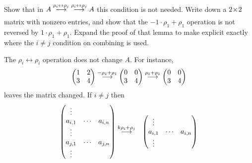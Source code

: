 \begin{exercises}
\begin{exparts}
        Show that in 
        $A\mathrel{ \mathop{\longrightarrow}\limits^{\rho_i\leftrightarrow\rho_j\mathstrut}_{ \begin{subarray}{l} \relax \end{subarray}}}\;
          \mathrel{ \mathop{\longrightarrow}\limits^{\rho_i\leftrightarrow\rho_j\mathstrut}_{ \begin{subarray}{l} \relax \end{subarray}}}A$
        this condition is not needed.
     \partsitem Write down a $2 \! \times \! 2$ matrix with nonzero entries,
        and show that the $-1\cdot\rho_1+\rho_1$ operation is not
        reversed by $1\cdot\rho_1+\rho_1$.
     \partsitem Expand the proof of that lemma to make explicit exactly where 
        the $i\neq j$ condition on combining is used.
   \end{exparts}
   \begin{answer}
    \begin{exparts}
      \partsitem The $\rho_i\leftrightarrow\rho_i$ operation does not
        change $A$.
      \partsitem For instance,
        \begin{equation*}
          \begin{pmatrix}
            1  &2  \\
            3  &4  
          \end{pmatrix}
          \mathrel{ \mathop{\longrightarrow}\limits^{-\rho_1+\rho_1\mathstrut}_{ \begin{subarray}{l} \relax \end{subarray}}}
          \begin{pmatrix}
            0  &0  \\
            3  &4  
          \end{pmatrix}
          \mathrel{ \mathop{\longrightarrow}\limits^{\rho_1+\rho_1\mathstrut}_{ \begin{subarray}{l} \relax \end{subarray}}}
          \begin{pmatrix}
            0  &0  \\
            3  &4  
          \end{pmatrix}
        \end{equation*}
        leaves the matrix changed.
      \partsitem If $i\neq j$ then
        \begin{eqnarray*}
          \begin{pmatrix}
            \vdots                     \\
            a_{i,1}  &\cdots  &a_{i,n}  \\
            \vdots                     \\
            a_{j,1}  &\cdots  &a_{j,n}  \\
            \vdots                     
          \end{pmatrix}
          &\mathrel{ \mathop{\longrightarrow}\limits^{k\rho_i+\rho_j\mathstrut}_{ \begin{subarray}{l} \relax \end{subarray}}}
          &\begin{pmatrix}
            \vdots                                      \\
            a_{i,1}           &\cdots  &a_{i,n}          \\
            \vdots                                      \\

\end{pmatrix}
\end{eqnarray*}
\end{exparts}
\end{answer}
\end{exercises}
